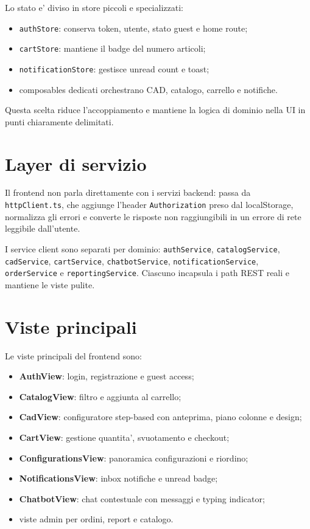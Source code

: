 Lo stato e' diviso in store piccoli e specializzati:

\begin{itemize}
\item \texttt{authStore}: conserva token, utente, stato guest e home route;
\item \texttt{cartStore}: mantiene il badge del numero articoli;
\item \texttt{notificationStore}: gestisce unread count e toast;
\item composables dedicati orchestrano CAD, catalogo, carrello e notifiche.
\end{itemize}

Questa scelta riduce l'accoppiamento e mantiene la logica di dominio nella UI in punti chiaramente delimitati.

\section{Layer di servizio}

Il frontend non parla direttamente con i servizi backend: passa da \texttt{httpClient.ts}, che aggiunge l'header \texttt{Authorization} preso dal localStorage, normalizza gli errori e converte le risposte non raggiungibili in un errore di rete leggibile dall'utente.

I service client sono separati per dominio: \texttt{authService}, \texttt{catalogService}, \texttt{cadService}, \texttt{cartService}, \texttt{chatbotService}, \texttt{notificationService}, \texttt{orderService} e \texttt{reportingService}. Ciascuno incapsula i path REST reali e mantiene le viste pulite.

\section{Viste principali}

Le viste principali del frontend sono:

\begin{itemize}
\item \textbf{AuthView}: login, registrazione e guest access;
\item \textbf{CatalogView}: filtro e aggiunta al carrello;
\item \textbf{CadView}: configuratore step-based con anteprima, piano colonne e design;
\item \textbf{CartView}: gestione quantita', svuotamento e checkout;
\item \textbf{ConfigurationsView}: panoramica configurazioni e riordino;
\item \textbf{NotificationsView}: inbox notifiche e unread badge;
\item \textbf{ChatbotView}: chat contestuale con messaggi e typing indicator;
\item viste admin per ordini, report e catalogo.
\end{itemize}

